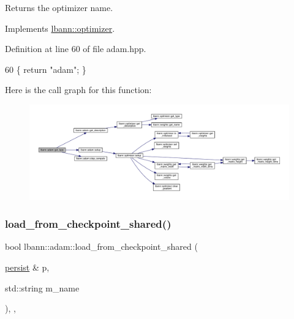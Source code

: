 Returns the optimizer name. 

Implements \hyperlink{classlbann_1_1optimizer_a7b7a6814e14eeee157e1cbb7f15dd4ff}{lbann\+::optimizer}.



Definition at line 60 of file adam.\+hpp.


\begin{DoxyCode}
60 \{ \textcolor{keywordflow}{return} \textcolor{stringliteral}{"adam"}; \}
\end{DoxyCode}
Here is the call graph for this function\+:\nopagebreak
\begin{figure}[H]
\begin{center}
\leavevmode
\includegraphics[width=350pt]{classlbann_1_1adam_a091b61b0125d2da89d4029dd30ca1ce7_cgraph}
\end{center}
\end{figure}
\mbox{\label{classlbann_1_1adam_aca07e925a4751fc5c10a62fb9c72c896}} 
\subsubsection{\texorpdfstring{load\+\_\+from\+\_\+checkpoint\+\_\+shared()}{load\_from\_checkpoint\_shared()}}
{\footnotesize\ttfamily bool lbann\+::adam\+::load\+\_\+from\+\_\+checkpoint\+\_\+shared (\begin{DoxyParamCaption}\item[{\hyperlink{classlbann_1_1persist}{persist} \&}]{p,  }\item[{std\+::string}]{m\+\_\+name }\end{DoxyParamCaption})\hspace{0.3cm}{\ttfamily [override]}, {\ttfamily [private]}, {\ttfamily [virtual]}}



